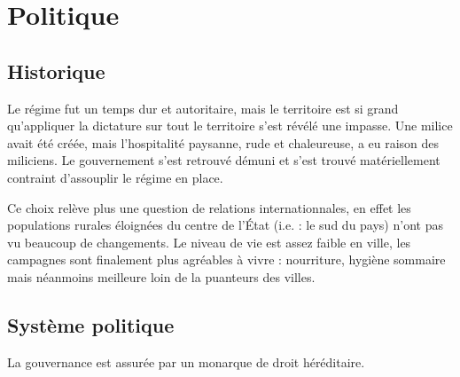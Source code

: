 \documentclass[french, a4paper, 12pt]{article}
\begin{document}
\section{Politique}

\subsection{Historique}

Le régime fut un temps dur et autoritaire, mais le territoire est si grand qu'appliquer la dictature sur tout le territoire s'est révélé une impasse. Une milice avait été créée, mais l'hospitalité paysanne, rude et chaleureuse, a eu raison des miliciens. Le gouvernement s'est retrouvé démuni et s'est trouvé matériellement contraint d'assouplir le régime en place.

Ce choix relève plus une question de relations internationnales, en effet les populations rurales éloignées du centre de l'État (i.e. : le sud du pays) n'ont pas vu beaucoup de changements. Le niveau de vie est assez faible en ville, les campagnes sont finalement plus agréables à vivre : nourriture, hygiène sommaire mais néanmoins meilleure loin de la puanteurs des villes.

\subsection{Système politique}

La gouvernance est assurée par un monarque de droit héréditaire.
\end{document}
